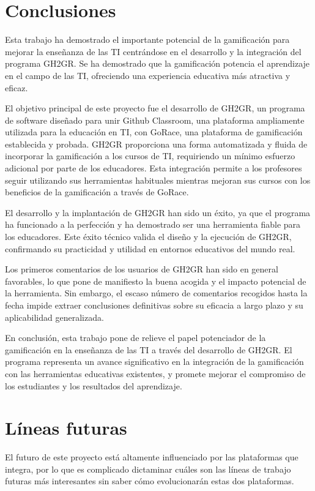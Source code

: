 \section{Conclusiones}
Esta trabajo ha demostrado el importante potencial de la gamificación para mejorar la enseñanza de las TI centrándose en el desarrollo y la integración del programa GH2GR. Se ha demostrado que la gamificación potencia el aprendizaje en el campo de las TI, ofreciendo una experiencia educativa más atractiva y eficaz.

El objetivo principal de este proyecto fue el desarrollo de GH2GR, un programa de software diseñado para unir Github Classroom, una plataforma ampliamente utilizada para la educación en TI, con GoRace, una plataforma de gamificación establecida y probada. GH2GR proporciona una forma automatizada y fluida de incorporar la gamificación a los cursos de TI, requiriendo un mínimo esfuerzo adicional por parte de los educadores. Esta integración permite a los profesores seguir utilizando sus herramientas habituales mientras mejoran sus cursos con los beneficios de la gamificación a través de GoRace.

El desarrollo y la implantación de GH2GR han sido un éxito, ya que el programa ha funcionado a la perfección y ha demostrado ser una herramienta fiable para los educadores. Este éxito técnico valida el diseño y la ejecución de GH2GR, confirmando su practicidad y utilidad en entornos educativos del mundo real.

Los primeros comentarios de los usuarios de GH2GR han sido en general favorables, lo que pone de manifiesto la buena acogida y el impacto potencial de la herramienta. Sin embargo, el escaso número de comentarios recogidos hasta la fecha impide extraer conclusiones definitivas sobre su eficacia a largo plazo y su aplicabilidad generalizada.

En conclusión, esta trabajo pone de relieve el papel potenciador de la gamificación en la enseñanza de las TI a través del desarrollo de GH2GR. El programa representa un avance significativo en la integración de la gamificación con las herramientas educativas existentes, y promete mejorar el compromiso de los estudiantes y los resultados del aprendizaje.

\section{Líneas futuras}
El futuro de este proyecto está altamente influenciado por las plataformas que integra, por lo que es complicado dictaminar cuáles son las líneas de trabajo futuras más interesantes sin saber cómo evolucionarán estas dos plataformas.

